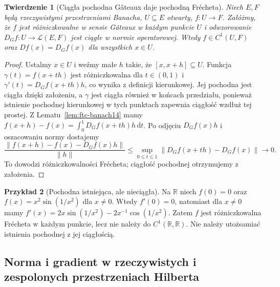 \documentclass[11pt,a4paper]{article}
\numberwithin{equation}{section}
\theoremstyle{plain}
\newtheorem{twierdzenie}{Twierdzenie}[section]
\theoremstyle{definition}
\newtheorem{przyklad}[twierdzenie]{Przykład}
\theoremstyle{remark}
\newcommand{\R}{\mathbb R}
\begin{document}
\begin{twierdzenie}[Ciągła pochodna Gâteaux daje pochodną Frécheta]
\label{thm:continuous-gateaux14}
Niech $E,F$ będą rzeczywistymi przestrzeniami Banacha, $U\subseteq E$ otwarty, $f:U\to F$. Załóżmy, że $f$ jest różniczkowalne w sensie Gâteaux w każdym punkcie $U$ i odwzorowanie $D_Gf:U\to\mathcal L(E,F)$ jest ciągłe w normie operatorowej. Wtedy $f\in C^1(U,F)$ oraz $Df(x)=D_Gf(x)$ dla wszystkich $x\in U$.
\end{twierdzenie}
\begin{proof}
Ustalmy $x\in U$ i weźmy małe $h$ takie, że $[x,x+h]\subseteq U$. Funkcja $\gamma(t)=f(x+th)$ jest różniczkowalna dla $t\in(0,1)$ i $\gamma'(t)=D_Gf(x+th)h$, co wynika z definicji kierunkowej. Jej pochodna jest ciągła dzięki założeniu, a $\gamma$ jest ciągła również w końcach przedziału, ponieważ istnienie pochodnej kierunkowej w tych punktach zapewnia ciągłość wzdłuż tej prostej. Z Lematu~\ref{lem:ftc-banach14} mamy
$f(x+h)-f(x)=\int_0^1 D_Gf(x+th)h\,\mathrm dt$.
Po odjęciu $D_Gf(x)h$ i oszacowaniu normy dostajemy
\[
\frac{\|f(x+h)-f(x)-D_Gf(x)h\|}{\|h\|}
\le\sup_{0\le t\le1}\|D_Gf(x+th)-D_Gf(x)\|\longrightarrow0.
\]
To dowodzi różniczkowalności Frécheta; ciągłość pochodnej otrzymujemy z założenia.
\end{proof}

\begin{przyklad}[Pochodna istniejąca, ale nieciągła]
\label{ex:derivative-noncontinuous14}
Na $\R$ niech $f(0)=0$ oraz $f(x)=x^2\sin(1/x^2)$ dla $x\ne0$. Wtedy $f'(0)=0$, natomiast dla $x\ne0$ mamy $f'(x)=2x\sin(1/x^2)-2x^{-1}\cos(1/x^2)$. Zatem $f$ jest różniczkowalna Frécheta w każdym punkcie, lecz nie należy do $C^1(\R,\R)$. Nie należy utożsamiać istnienia pochodnej z jej ciągłością.
\end{przyklad}

\subsection{Norma i gradient w rzeczywistych i zespolonych przestrzeniach Hilberta}
\end{document}
